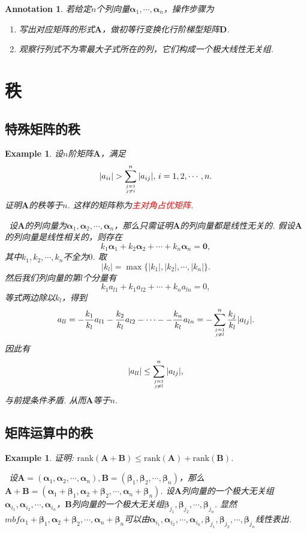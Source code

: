 \documentclass{article}
\newtheorem{example}[theorem]{Example}
\newtheorem{annotation}[theorem]{Annotation}
\newcommand{\hints}{{\color{blue} \text{hints}}}
\newcommand{\mbf}[1]{\bm{#1}}
\newcommand{\rank}[1]{\text{rank}\left(#1\right)} %
\newcommand{\redt}[1]{\textcolor{red}{#1}}
\begin{document}
\begin{annotation}
\rm 若给定$n$个列向量$\mbf{\alpha}_1,\cdots,\mbf{\alpha}_n$，操作步骤为
\begin{enumerate}
	\item 写出对应矩阵的形式$\mbf{A}$，做初等行变换化行阶梯型矩阵$\mbf{D}$.
	\item 观察行列式不为零最大子式所在的列，它们构成一个极大线性无关组. 
\end{enumerate}
\end{annotation}


\newpage
\section{秩}

\subsection{特殊矩阵的秩}

\begin{example}
\rm 设$n$阶矩阵$\mbf{A}$，满足
$$
|a_{ii}| >  \sum\limits_{j = 1 \atop j \neq i}^{n} |a_{ij}|, \, i = 1,2,\cdots,n.
$$
证明$\mbf{A}$的秩等于$n$. 这样的矩阵称为\redt{主对角占优矩阵}. 

\hints\  设$\mbf{A}$的列向量为$\mbf{\alpha}_1,\mbf{\alpha}_2,\cdots,\mbf{\alpha}_n$，那么只需证明$\mbf{A}$的列向量都是线性无关的. 假设$\mbf{A}$的列向量是线性相关的，则存在
$$
k_1\mbf{\alpha}_1 + k_2\mbf{\alpha}_2 + \cdots + k_n\mbf{\alpha}_n = \mbf{0},
$$
其中$k_1,k_2,\cdots,k_n$不全为$0$. 取
$$
|k_l| = \max\{|k_1|,|k_2|,\cdots,|k_n|\}. 
$$
然后我们列向量的第$l$个分量有
$$
k_1a_{l1} + k_1a_{l2} + \cdots + k_na_{ln} = 0,
$$
等式两边除以$k_l$，得到
$$
a_{ll} = - \frac{k_1}{k_l}a_{l1} - \frac{k_2}{k_l}a_{l2} - \cdots - - \frac{k_n}{k_l}a_{ln} =  -\sum\limits_{j = 1 \atop j \neq l}^{n} \frac{k_j}{k_l}|a_{lj}|.
$$
因此有
$$
|a_{ll}| \leq \sum\limits_{j = 1 \atop j \neq l}^{n} |a_{lj}|,
$$
与前提条件矛盾. 从而$\mbf{A}$等于$n$. 
\end{example}

\subsection{矩阵运算中的秩}

\begin{example}
\rm 证明: $\rank{\mbf{A}+\mbf{B}} \leq \rank{\mbf{A}} + \rank{\mbf{B}}$.

\hints\ 设$\mbf{A} = (\mbf{\alpha}_1,\mbf{\alpha}_2,\cdots,\mbf{\alpha}_n),\mbf{B}=(\mbf{\beta}_1,\mbf{\beta}_2,\cdots,\mbf{\beta}_n)$，那么$\mbf{A}+\mbf{B} = (\mbf{\alpha}_1+\mbf{\beta}_1,\mbf{\alpha}_2+\mbf{\beta}_2,\cdots,\mbf{\alpha}_n+\mbf{\beta}_n)$. 设$\mbf{A}$列向量的一个极大无关组$\mbf{\alpha}_{i_1},\mbf{\alpha}_{i_2},\cdots,\mbf{\alpha}_{i_n}$，$\mbf{B}$列向量的一个极大无关组$\mbf{\beta}_{j_1},\mbf{\beta}_{j_2},\cdots,\mbf{\beta}_{j_n}$. 显然$mbf{\alpha}_1+\mbf{\beta}_1,\mbf{\alpha}_2+\mbf{\beta}_2,\cdots,\mbf{\alpha}_n+\mbf{\beta}_n$可以由$\mbf{\alpha}_{i_1},\mbf{\alpha}_{i_2},\cdots,\mbf{\alpha}_{i_n},\mbf{\beta}_{j_1},\mbf{\beta}_{j_2},\cdots,\mbf{\beta}_{j_n}$线性表出. 
\end{example}
\end{document}

